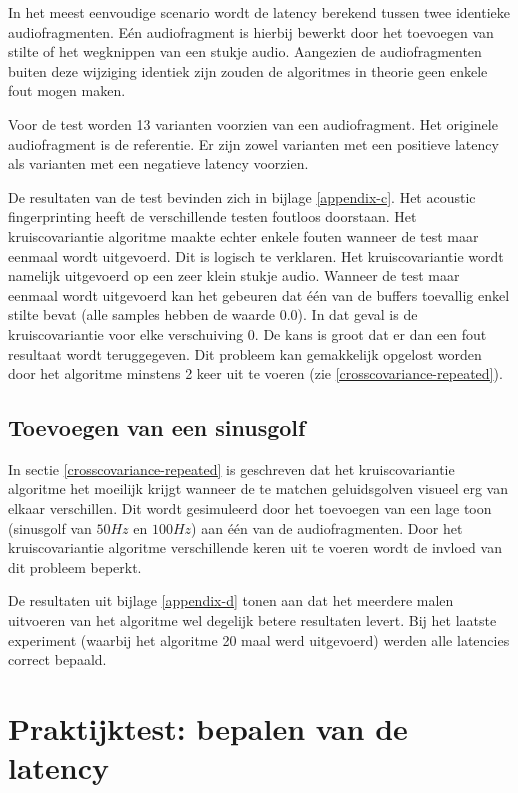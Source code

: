 In het meest eenvoudige scenario wordt de latency berekend tussen twee identieke audiofragmenten. Eén audiofragment is hierbij bewerkt door het toevoegen van stilte of het wegknippen van een stukje audio. Aangezien de audiofragmenten buiten deze wijziging identiek zijn zouden de algoritmes in theorie geen enkele fout mogen maken.

Voor de test worden 13 varianten voorzien van een audiofragment. Het originele audiofragment is de referentie. Er zijn zowel varianten met een positieve latency als varianten met een negatieve latency voorzien.

De resultaten van de test bevinden zich in bijlage \ref{appendix-c}. Het acoustic fingerprinting heeft de verschillende testen foutloos doorstaan. Het kruiscovariantie algoritme maakte echter enkele fouten wanneer de test maar eenmaal wordt uitgevoerd. Dit is logisch te verklaren. Het kruiscovariantie wordt namelijk uitgevoerd op een zeer klein stukje audio. Wanneer de test maar eenmaal wordt uitgevoerd kan het gebeuren dat één van de buffers toevallig enkel stilte bevat (alle samples hebben de waarde 0.0). In dat geval is de kruiscovariantie voor elke verschuiving 0. De kans is groot dat er dan een fout resultaat wordt teruggegeven. Dit probleem kan gemakkelijk opgelost worden door het algoritme minstens 2 keer uit te voeren (zie \ref{crosscovariance-repeated}).

\subsection{Toevoegen van een sinusgolf}
\label{sine-test}

In sectie \ref{crosscovariance-repeated} is geschreven dat het kruiscovariantie algoritme het moeilijk krijgt wanneer de te matchen geluidsgolven visueel erg van elkaar verschillen. Dit wordt gesimuleerd door het toevoegen van een lage toon (sinusgolf van $50Hz$ en $100Hz$) aan één van de audiofragmenten. Door het kruiscovariantie algoritme verschillende keren uit te voeren wordt de invloed van dit probleem beperkt.

De resultaten uit bijlage \ref{appendix-d} tonen aan dat het meerdere malen uitvoeren van het algoritme wel degelijk betere resultaten levert. Bij het laatste experiment (waarbij het algoritme 20 maal werd uitgevoerd) werden alle latencies correct bepaald.

\section{Praktijktest: bepalen van de latency}
\label{praktijktest}

